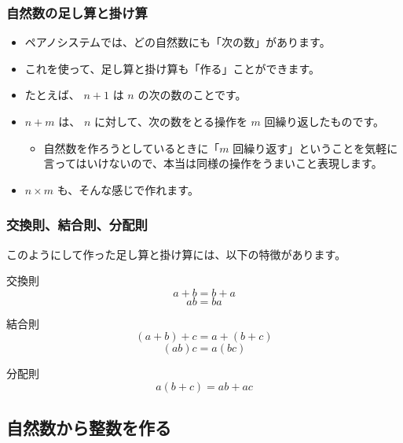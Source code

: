 \documentclass[dvipdfmx]{beamer}
\begin{document}
  \begin{frame}
    \frametitle{自然数の足し算と掛け算}

    \begin{itemize}
      \item ペアノシステムでは、どの自然数にも「次の数」があります。
      \item これを使って、足し算と掛け算も「作る」ことができます。
      \item たとえば、 $n+1$ は $n$ の次の数のことです。
      \item $n+m$ は、 $n$ に対して、次の数をとる操作を $m$ 回繰り返したものです。
      \begin{itemize}
        \item 自然数を作ろうとしているときに「$m$ 回繰り返す」ということを気軽に言ってはいけないので、本当は同様の操作をうまいこと表現します。
      \end{itemize}
      \item $n \times m$ も、そんな感じで作れます。
    \end{itemize}

  \end{frame}

  \begin{frame}
    \frametitle{交換則、結合則、分配則}

    このようにして作った足し算と掛け算には、以下の特徴があります。
    \begin{block}{交換則}
      \[a+b = b+a\]
      \[ab = ba\]
    \end{block}

    \begin{block}{結合則}
      \[(a+b)+c = a+(b+c)\]
      \[(ab)c = a(bc)\]
    \end{block}

    \begin{block}{分配則}
      \[a(b+c) = ab+ac\]
    \end{block}

  \end{frame}

  \subsection{自然数から整数を作る}
\end{document}
